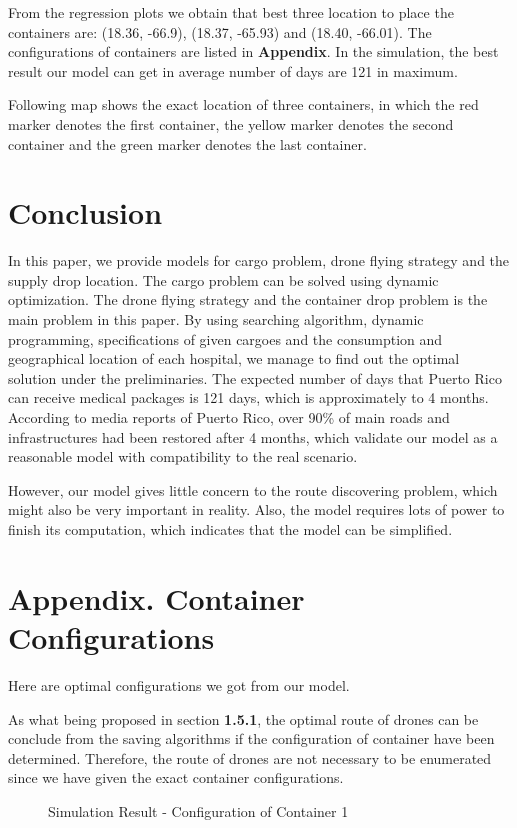 \documentclass[12pt]{article}
\begin{document}
		From the regression plots we obtain that best three location to place the containers are: (18.36, -66.9), (18.37, -65.93) and (18.40, -66.01). The configurations of containers are listed in \textbf{Appendix}. In the simulation, the best result our model can get in average number of days are 121 in maximum.\par 
		Following map shows the exact location of three containers, in which the red marker denotes the first container, the yellow marker denotes the second container and the green marker denotes the last container.
		\begin{figure}[H]
			\centering
		\end{figure}
	
	\section{Conclusion}
	In this paper, we provide models for cargo problem, drone flying strategy and the supply drop location. The cargo problem can be solved using dynamic optimization. The drone flying strategy and the container drop problem is the main problem in this paper. By using searching algorithm, dynamic programming, specifications of given cargoes and the consumption and geographical location of each hospital, we manage to find out the optimal solution under the preliminaries. The expected number of days that Puerto Rico can receive medical packages is 121 days, which is approximately to 4 months. According to media reports of Puerto Rico, over 90\% of main roads and infrastructures had been restored after 4 months, which validate our model as a reasonable model with compatibility to the real scenario. \par 
	
	However, our model gives little concern to the route discovering problem, which might also be very important in reality. Also, the model requires lots of power to finish its computation, which indicates that the model can be simplified.
	
	\newpage
	\section{Appendix. Container Configurations}	
	Here are optimal configurations we got from our model. \par 
	As what being proposed in section \textbf{1.5.1}, the optimal route of drones can be conclude from the saving algorithms if the configuration of container have been determined. Therefore, the route of drones are not necessary to be enumerated since we have given the exact container configurations. 
	\begin{figure}[H]
		\centering
		\caption{Simulation Result - Configuration of Container 1}
	\end{figure}
	
\end{document}
